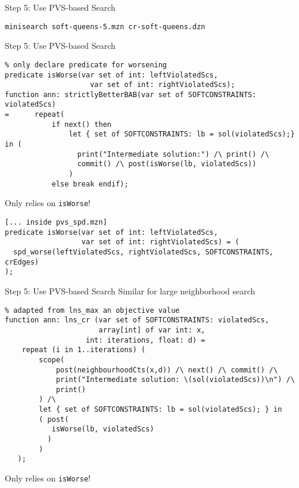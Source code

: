\documentclass[10pt,xcolor={dvipsnames},fleqn]{beamer}
\begin{document}
\begin{frame}[fragile]{Step 5: Use PVS-based Search}

\small
\begin{verbatim}
minisearch soft-queens-5.mzn cr-soft-queens.dzn 
\end{verbatim}
\end{frame}

\begin{frame}[fragile]{Step 5: Use PVS-based Search}
\begin{lstlisting}
% only declare predicate for worsening
predicate isWorse(var set of int: leftViolatedScs, 
                    var set of int: rightViolatedScs); 
function ann: strictlyBetterBAB(var set of SOFTCONSTRAINTS: violatedScs) 
=      repeat(
           if next() then 
               let { set of SOFTCONSTRAINTS: lb = sol(violatedScs);} in (
                 print("Intermediate solution:") /\ print() /\
                 commit() /\ post(isWorse(lb, violatedScs))
               )
           else break endif);
\end{lstlisting}
\small
Only relies on \texttt{isWorse}!

\begin{lstlisting}
[... inside pvs_spd.mzn]
predicate isWorse(var set of int: leftViolatedScs, 
                  var set of int: rightViolatedScs) = (
  spd_worse(leftViolatedScs, rightViolatedScs, SOFTCONSTRAINTS, crEdges)
);

\end{lstlisting}
\end{frame}

\begin{frame}[fragile]{Step 5: Use PVS-based Search}
Similar for large neighborhood search
\begin{lstlisting}
% adapted from lns_max an objective value 
function ann: lns_cr (var set of SOFTCONSTRAINTS: violatedScs, 
                      array[int] of var int: x,
                   int: iterations, float: d) = 
    repeat (i in 1..iterations) (
        scope(
            post(neighbourhoodCts(x,d)) /\ next() /\ commit() /\ 
            print("Intermediate solution: \(sol(violatedScs))\n") /\
            print()
        ) /\
        let { set of SOFTCONSTRAINTS: lb = sol(violatedScs); } in 
        ( post(
           isWorse(lb, violatedScs) 
          ) 
        )
   );

\end{lstlisting}
\small
Only relies on \texttt{isWorse}!

\end{frame}
\end{document}
